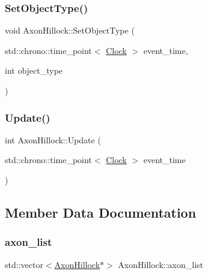 \subsubsection{\texorpdfstring{Set\+Object\+Type()}{SetObjectType()}}
{\footnotesize\ttfamily void Axon\+Hillock\+::\+Set\+Object\+Type (\begin{DoxyParamCaption}\item[{std\+::chrono\+::time\+\_\+point$<$ \mbox{\hyperlink{universe_8h_a0ef8d951d1ca5ab3cfaf7ab4c7a6fd80}{Clock}} $>$}]{event\+\_\+time,  }\item[{int}]{object\+\_\+type }\end{DoxyParamCaption})}

\mbox{\label{classAxonHillock_a5a6a6a93a98b32c303b9ee6320c09909}} 
\subsubsection{\texorpdfstring{Update()}{Update()}}
{\footnotesize\ttfamily int Axon\+Hillock\+::\+Update (\begin{DoxyParamCaption}\item[{std\+::chrono\+::time\+\_\+point$<$ \mbox{\hyperlink{universe_8h_a0ef8d951d1ca5ab3cfaf7ab4c7a6fd80}{Clock}} $>$}]{event\+\_\+time }\end{DoxyParamCaption})}



\subsection{Member Data Documentation}
\mbox{\label{classAxonHillock_a110d655ded8e09306b224b6e940cd60b}} 
\subsubsection{\texorpdfstring{axon\+\_\+list}{axon\_list}}
{\footnotesize\ttfamily std\+::vector$<$\mbox{\hyperlink{classAxonHillock}{Axon\+Hillock}}$\ast$$>$ Axon\+Hillock\+::axon\+\_\+list\hspace{0.3cm}{\ttfamily [protected]}}

\mbox{\label{classAxonHillock_a5128d2562b42d29b7bfc1492bfce7066}} 
